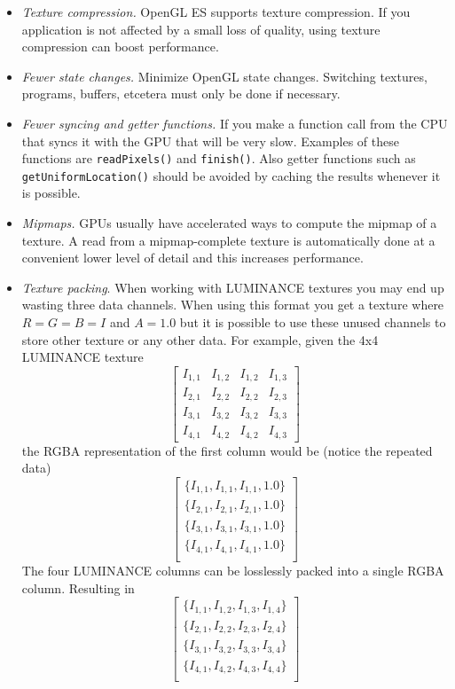 \documentclass[conference]{IEEEtran}
\begin{document}
\begin{itemize}
\item \emph{Texture compression.} OpenGL ES supports texture compression. If you application is not affected by a small loss of quality, using texture compression can boost performance.
\item \emph{Fewer state changes.} Minimize OpenGL state changes. Switching textures, programs, buffers, etcetera must only be done if necessary.
\item \emph{Fewer syncing and getter functions.} If you make a function call from the CPU that syncs it with the GPU that will be very slow. Examples of these functions are \texttt{readPixels()} and \texttt{finish()}. Also getter functions such as \texttt{getUniformLocation()} should be avoided by caching the results whenever it is possible.
\item \emph{Mipmaps.} GPUs usually have accelerated ways to compute the mipmap of a texture. A read from a mipmap-complete texture is automatically done at a convenient lower level of detail and this increases performance.
\item \emph{Texture packing}. When working with LUMINANCE textures you may end up wasting three data channels. When using this format you get a texture where $R=G=B=I$ and $A=1.0$ but it is possible to use these unused channels to store other texture or any other data. For example, given the 4x4 LUMINANCE texture
\begin{equation*}
\label{eq:luminance}
\begin{bmatrix}
I_{1,1} & I_{1,2} & I_{1,2} & I_{1,3}\\ 
I_{2,1} & I_{2,2} & I_{2,2} & I_{2,3}\\ 
I_{3,1} & I_{3,2} & I_{3,2} & I_{3,3}\\ 
I_{4,1} & I_{4,2} & I_{4,2} & I_{4,3}
\end{bmatrix}
\end{equation*}
the RGBA representation of the first column would be (notice the repeated data)
\begin{equation*}
\label{eq:rgba}
\begin{bmatrix}
\{I_{1,1}, I_{1,1}, I_{1,1}, 1.0\}\\ 
\{I_{2,1}, I_{2,1}, I_{2,1}, 1.0\}\\ 
\{I_{3,1}, I_{3,1}, I_{3,1}, 1.0\}\\ 
\{I_{4,1}, I_{4,1}, I_{4,1}, 1.0\}\\ 
\end{bmatrix}
\end{equation*}
The four LUMINANCE columns can be losslessly packed into a single RGBA column. Resulting in 
\begin{equation*}
\label{eq:rgbapacked}
\begin{bmatrix}
\{I_{1,1}, I_{1,2}, I_{1,3}, I_{1,4}\}\\ 
\{I_{2,1}, I_{2,2}, I_{2,3}, I_{2,4}\}\\ 
\{I_{3,1}, I_{3,2}, I_{3,3}, I_{3,4}\}\\ 
\{I_{4,1}, I_{4,2}, I_{4,3}, I_{4,4}\}\\ 
\end{bmatrix}
\end{equation*}


\end{itemize}
\end{document}
